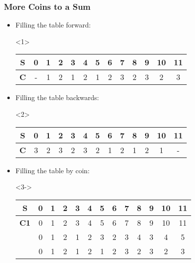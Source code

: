 \documentclass{beamer}
\begin{document}
\begin{frame}
  \frametitle{More Coins to a Sum}
  \begin{itemize}
  \item Filling the table forward:
    \begin{onlyenv}<1>
    \begin{center}
      \begin{tabular}{c|c|c|c|c|c|c|c|c|c|c|c|c}
        \hline
            {\bf S} & 0 & 1 & 2 & 3 & 4 & 5 & 6 & 7 & 8 & 9 & 10 & 11\\
            \hline
                {\bf C} & - & 1 & 2 & 1 & 2 & 1 & 2 & 3 & 2 & 3 & 2 & 3\\
                \hline
      \end{tabular}
    \end{center}
    \medskip
    \end{onlyenv}

  \item Filling the table backwards: 
    \begin{onlyenv}<2>
    \begin{center}
      \begin{tabular}{c|c|c|c|c|c|c|c|c|c|c|c|c}
        \hline
            {\bf S} & 0 & 1 & 2 & 3 & 4 & 5 & 6 & 7 & 8 & 9 & 10 & 11\\
            \hline
                {\bf C} & 3 & 2 & 3 & 2 & 3 & 2 & 1 & 2 & 1 & 2 & 1 & -\\
                \hline
      \end{tabular}
    \end{center}
    \medskip
    \end{onlyenv}

  \item Filling the table by coin:
    \begin{onlyenv}<3->
    \begin{center}
      \begin{tabular}{c|c|c|c|c|c|c|c|c|c|c|c|c}
        \hline
            {\bf S} & 0 & 1 & 2 & 3 & 4 & 5 & 6 & 7 & 8 & 9 & 10 & 11\\
            \hline
            {\bf C1} & 0 & 1 & 2 & 3 & 4 & 5 & 6 & 7 & 8 & 9 & 10 & 11\\
            \only<4->{{\bf C2} & 0 & 1 & 2 & 1 & 2 & 3 & 2 & 3 & 4 & 3 & 4 & 5}\\
            \only<5>{{\bf C3} & 0 & 1 & 2 & 1 & 2 & 1 & 2 & 3 & 2 & 3 & 2 & 3}\\
            \hline
      \end{tabular}
    \end{center}
    \end{onlyenv}
  \end{itemize}

\end{frame}
\end{document}
